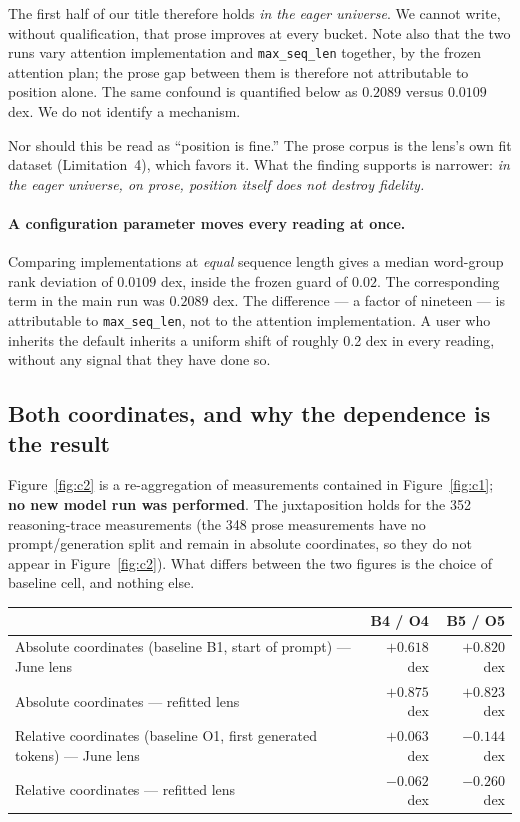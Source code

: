 \documentclass[11pt]{article}
\begin{document}
The first half of our title therefore holds \emph{in the eager universe}.
We cannot write, without qualification, that prose improves at every
bucket. Note also that the two runs vary attention implementation and
\texttt{max\_seq\_len} together, by the frozen attention plan; the prose
gap between them is therefore not attributable to position alone. The
same confound is quantified below as $0.2089$ versus $0.0109$ dex. We do
not identify a mechanism.

Nor should this be read as ``position is fine.'' The prose corpus is the
lens's own fit dataset (Limitation~4), which favors it. What the finding
supports is narrower: \emph{in the eager universe, on prose, position
itself does not destroy fidelity.}

\paragraph{A configuration parameter moves every reading at once.}
Comparing implementations at \emph{equal} sequence length gives a median
word-group rank deviation of $0.0109$ dex, inside the frozen guard of
$0.02$. The corresponding term in the main run was $0.2089$ dex. The
difference --- a factor of nineteen --- is attributable to
\texttt{max\_seq\_len}, not to the attention implementation. A user who
inherits the default inherits a uniform shift of roughly 0.2 dex in every
reading, without any signal that they have done so.

\subsection{Both coordinates, and why the dependence is the result}
\label{sec:coords}

Figure~\ref{fig:c2} is a re-aggregation of measurements contained in
Figure~\ref{fig:c1}; \textbf{no new model run was performed}. The
juxtaposition holds for the 352 reasoning-trace measurements (the 348
prose measurements have no prompt/generation split and remain in absolute
coordinates, so they do not appear in Figure~\ref{fig:c2}). What differs
between the two figures is the choice of baseline cell, and nothing else.

\begin{center}
\small
\begin{tabular}{@{}lrr@{}}
\toprule
 & B4 / O4 & B5 / O5 \\
\midrule
Absolute coordinates (baseline B1, start of prompt) --- June lens & $+0.618$ dex & $+0.820$ dex \\
Absolute coordinates --- refitted lens & $+0.875$ dex & $+0.823$ dex \\
Relative coordinates (baseline O1, first generated tokens) --- June lens & $+0.063$ dex & $-0.144$ dex \\
Relative coordinates --- refitted lens & $-0.062$ dex & $-0.260$ dex \\
\bottomrule
\end{tabular}
\end{center}
\end{document}
